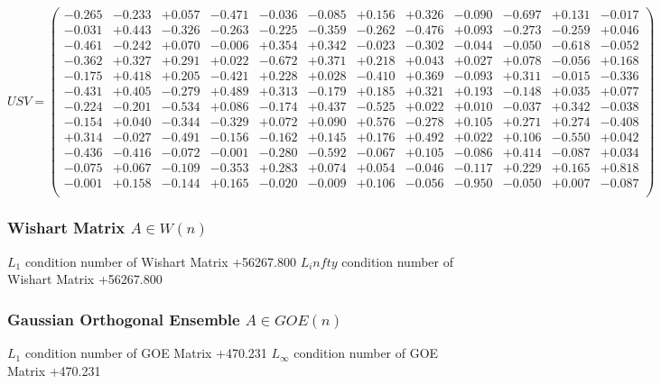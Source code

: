 \documentclass[9pt]{article}
\theoremstyle{plain}
\theoremstyle{definition}
\theoremstyle{remark}
\numberwithin{equation}{section}
\begin{document}
$U S V = \left(
\begin{array}{
cccccccccccc}
-0.265 & -0.233 & +0.057 & -0.471 & -0.036 & -0.085 & +0.156 & +0.326 & -0.090 & -0.697 & +0.131 & -0.017 \\
-0.031 & +0.443 & -0.326 & -0.263 & -0.225 & -0.359 & -0.262 & -0.476 & +0.093 & -0.273 & -0.259 & +0.046 \\
-0.461 & -0.242 & +0.070 & -0.006 & +0.354 & +0.342 & -0.023 & -0.302 & -0.044 & -0.050 & -0.618 & -0.052 \\
-0.362 & +0.327 & +0.291 & +0.022 & -0.672 & +0.371 & +0.218 & +0.043 & +0.027 & +0.078 & -0.056 & +0.168 \\
-0.175 & +0.418 & +0.205 & -0.421 & +0.228 & +0.028 & -0.410 & +0.369 & -0.093 & +0.311 & -0.015 & -0.336 \\
-0.431 & +0.405 & -0.279 & +0.489 & +0.313 & -0.179 & +0.185 & +0.321 & +0.193 & -0.148 & +0.035 & +0.077 \\
-0.224 & -0.201 & -0.534 & +0.086 & -0.174 & +0.437 & -0.525 & +0.022 & +0.010 & -0.037 & +0.342 & -0.038 \\
-0.154 & +0.040 & -0.344 & -0.329 & +0.072 & +0.090 & +0.576 & -0.278 & +0.105 & +0.271 & +0.274 & -0.408 \\
+0.314 & -0.027 & -0.491 & -0.156 & -0.162 & +0.145 & +0.176 & +0.492 & +0.022 & +0.106 & -0.550 & +0.042 \\
-0.436 & -0.416 & -0.072 & -0.001 & -0.280 & -0.592 & -0.067 & +0.105 & -0.086 & +0.414 & -0.087 & +0.034 \\
-0.075 & +0.067 & -0.109 & -0.353 & +0.283 & +0.074 & +0.054 & -0.046 & -0.117 & +0.229 & +0.165 & +0.818 \\
-0.001 & +0.158 & -0.144 & +0.165 & -0.020 & -0.009 & +0.106 & -0.056 & -0.950 & -0.050 & +0.007 & -0.087 \\
\end{array}
\right)$ \newline 

\subsubsection{Wishart Matrix $A \in W(n)$}
$L_1$ condition number of Wishart Matrix +56267.800
$L_infty$ condition number of Wishart Matrix +56267.800
\subsubsection{Gaussian Orthogonal Ensemble $A \in GOE(n)$}
$L_1$ condition number of GOE Matrix +470.231
$L_\infty$ condition number of GOE Matrix +470.231
\end{document}
